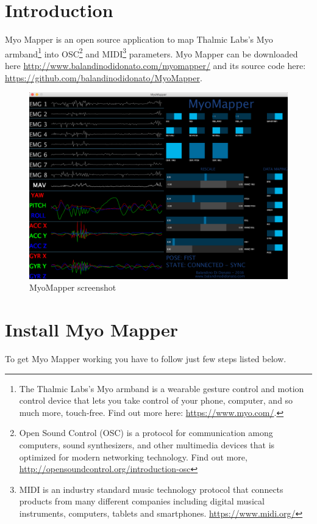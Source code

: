 \documentclass[12pt,a4paper]{article}
\begin{document}
\newpage
\section{Introduction}
Myo Mapper is an open source application to map Thalmic Labs's Myo armband\footnote{The Thalmic Labs's Myo armband is a wearable gesture control and motion control device that lets you take control of your phone, computer, and so much more, touch-free. Find out more here: \url{https://www.myo.com/}.} into OSC\footnote{Open Sound Control (OSC) is a protocol for communication among computers, sound synthesizers, and other multimedia devices that is optimized for modern networking technology. Find out more, \url{http://opensoundcontrol.org/introduction-osc}} and MIDI\footnote{MIDI is an industry standard music technology protocol that connects products from many different companies including digital musical instruments, computers, tablets and smartphones. \url{https://www.midi.org/}} parameters. Myo Mapper can be downloaded here \url{http://www.balandinodidonato.com/myomapper/} and its source code here: \url{https://github.com/balandinodidonato/MyoMapper}.

	\begin{figure}[h]
		\centering
		\includegraphics[width=1\linewidth]{../MyoMapper}
		\caption{MyoMapper screenshot}
		\label{fig:MyoMapperIntro}
	\end{figure}

\newpage

\section{Install Myo Mapper}
To get Myo Mapper working you have to follow just few steps listed below.
\end{document}
